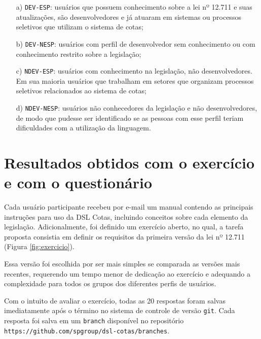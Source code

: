 \begin{enumerate}
    \item[a)] \texttt{DEV-ESP}: usuários que possuem conhecimento sobre a lei nº 12.711 e suas atualizações, são desenvolvedores e já atuaram em sistemas ou processos seletivos que utilizam o sistema de cotas;
    \item[b)] \texttt{DEV-NESP}: usuários com perfil de desenvolvedor sem conhecimento ou com conhecimento restrito sobre a legislação;
    \item[c)] \texttt{NDEV-ESP}: usuários com conhecimento na legislação, não desenvolvedores. Em sua maioria usuários que trabalham em setores que organizam processos seletivos relacionados ao sistema de cotas;
    \item[d)] \texttt{NDEV-NESP}: usuários não conhecedores da legislação e não desenvolvedores, de modo que pudesse ser identificado se as pessoas com esse perfil teriam dificuldades com a utilização da linguagem.
\end{enumerate}


\begin{landscape}

\end{landscape}

\section{Resultados obtidos com o exercício e com o questionário}
\label{sec:perguntasaplicadas}

Cada usuário participante recebeu por e-mail um manual  contendo as principais instruções para uso da DSL Cotas, incluindo conceitos sobre cada elemento da legislação. Adicionalmente, foi definido um exercício aberto, no qual, a tarefa proposta consistia em definir os requisitos da primeira versão da lei nº 12.711 (Figura \ref{fig:exercicio}). 



Essa versão foi escolhida por ser mais simples se comparada as versões mais recentes, requerendo um tempo menor de dedicação ao exercício e adequando a complexidade para todos os grupos dos diferentes perfis de usuários. 


Com o intuito de avaliar o exercício, todas as 20 respostas foram salvas imediatamente após o término no sistema de controle de versão \texttt{git}. Cada resposta foi salva em um \texttt{branch} disponível no repositório \texttt{https://github.com/spgroup/dsl-cotas/branches}.

